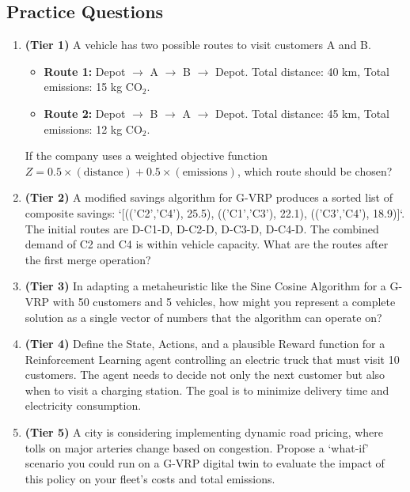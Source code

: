 \documentclass{article}
\begin{document}
\begin{enumerate}
\newpage
\section{Practice Questions}

\begin{enumerate}[label=\textbf{Q\arabic*.}, wide, labelwidth=!, labelindent=0pt]
    \item \textbf{(Tier 1)} A vehicle has two possible routes to visit customers A and B.
    \begin{itemize}
        \item \textbf{Route 1:} Depot $\rightarrow$ A $\rightarrow$ B $\rightarrow$ Depot. Total distance: 40 km, Total emissions: 15 kg CO$_2$.
        \item \textbf{Route 2:} Depot $\rightarrow$ B $\rightarrow$ A $\rightarrow$ Depot. Total distance: 45 km, Total emissions: 12 kg CO$_2$.
    \end{itemize}
    If the company uses a weighted objective function $Z = 0.5 \times (\text{distance}) + 0.5 \times (\text{emissions})$, which route should be chosen?

    \item \textbf{(Tier 2)} A modified savings algorithm for G-VRP produces a sorted list of composite savings: `[(('C2','C4'), 25.5), (('C1','C3'), 22.1), (('C3','C4'), 18.9)]`. The initial routes are {D-C1-D}, {D-C2-D}, {D-C3-D}, {D-C4-D}. The combined demand of C2 and C4 is within vehicle capacity. What are the routes after the first merge operation?

    \item \textbf{(Tier 3)} In adapting a metaheuristic like the Sine Cosine Algorithm for a G-VRP with 50 customers and 5 vehicles, how might you represent a complete solution as a single vector of numbers that the algorithm can operate on?

    \item \textbf{(Tier 4)} Define the State, Actions, and a plausible Reward function for a Reinforcement Learning agent controlling an electric truck that must visit 10 customers. The agent needs to decide not only the next customer but also when to visit a charging station. The goal is to minimize delivery time and electricity consumption.

    \item \textbf{(Tier 5)} A city is considering implementing dynamic road pricing, where tolls on major arteries change based on congestion. Propose a `what-if' scenario you could run on a G-VRP digital twin to evaluate the impact of this policy on your fleet's costs and total emissions.


\end{enumerate}
\end{enumerate}
\end{document}
